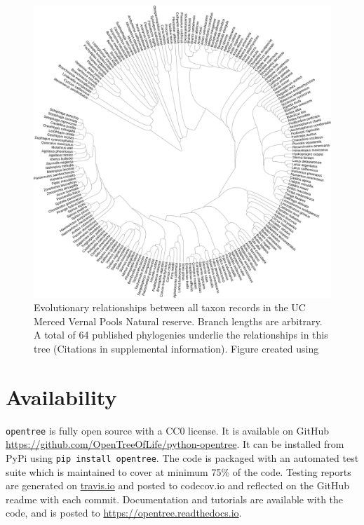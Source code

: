 \documentclass[oupdraft]{sysbio_sse}
\begin{document}
\begin{figure}[!p]
\centering\includegraphics[width=\textwidth]{vernal_animals}
\caption{Evolutionary relationships between all taxon records in the UC Merced Vernal Pools Natural reserve. Branch lengths are arbitrary. A total of 64 published phylogenies underlie the relationships in this tree (Citations in supplemental information). Figure created using \citep{letunic_interactive_2019}}
\label{vernalanimals}
\end{figure}



\section{Availability}
\label{sec5}

\texttt{opentree} is fully open source with a CC0 license. It is available on GitHub \url{ https://github.com/OpenTreeOfLife/python-opentree}. It can be installed from PyPi using \texttt{pip install opentree}. The code is packaged with an automated test suite which is maintained to cover at minimum 75\% of the code. Testing reports are generated on \url{travis.io} and posted to {codecov.io} and reflected on the GitHub readme with each commit. Documentation and tutorials are available with the code, and is posted to \url{https://opentree.readthedocs.io}.
\end{document}
